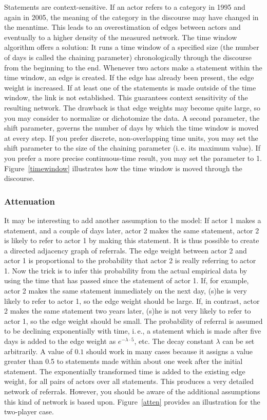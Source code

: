 \documentclass[12pt,a4paper]{scrreprt}
\begin{document}
Statements are context-sensitive. If an actor refers to a category in 1995 and again in 2005, the meaning of the category in the discourse may have changed in the meantime. This leads to an overestimation of edges between actors and eventually to a higher density of the measured network. The time window algorithm offers a solution: It runs a time window of a specified size (the number of days is called the chaining parameter) chronologically through the discourse from the beginning to the end. Whenever two actors make a statement within the time window, an edge is created. If the edge has already been present, the edge weight is increased. If at least one of the statements is made outside of the time window, the link is not established. This guarantees context sensitivity of the resulting network. The drawback is that edge weights may become quite large, so you may consider to normalize or dichotomize the data. A second parameter, the shift parameter, governs the number of days by which the time window is moved at every step. If you prefer discrete, non-overlapping time units, you may set the shift parameter to the size of the chaining parameter (i.\,e. its maximum value). If you prefer a more precise continuous-time result, you may set the parameter to 1. Figure~\ref{timewindow} illustrates how the time window is moved through the discourse.

\subsubsection{Attenuation}
It may be interesting to add another assumption to the model: If actor 1 makes a statement, and a couple of days later, actor 2 makes the same statement, actor 2 is likely to refer to actor 1 by making this statement. It is thus possible to create a directed adjacency graph of referrals. The edge weight between actor 2 and actor 1 is proportional to the probability that actor 2 is really referring to actor 1. Now the trick is to infer this probability from the actual empirical data by using the time that has passed since the statement of actor 1. If, for example, actor 2 makes the same statement immediately on the next day, (s)he is very likely to refer to actor 1, so the edge weight should be large. If, in contrast, actor 2 makes the same statement two years later, (s)he is not very likely to refer to actor 1, so the edge weight should be small. The probability of referral is assumed to be declining exponentially with time, i.\,e., a statement which is made after five days is added to the edge weight as $e^{-\lambda \cdot 5}$, etc. The decay constant $\lambda$ can be set arbitrarily. A value of $0.1$ should work in many cases because it assigns a value greater than 0.5 to statements made within about one week after the initial statement. The exponentially transformed time is added to the existing edge weight, for all pairs of actors over all statements. This produces a very detailed network of referrals. However, you should be aware of the additional assumptions this kind of network is based upon. Figure~\ref{atten} provides an illustration for the two-player case.
\end{document}

